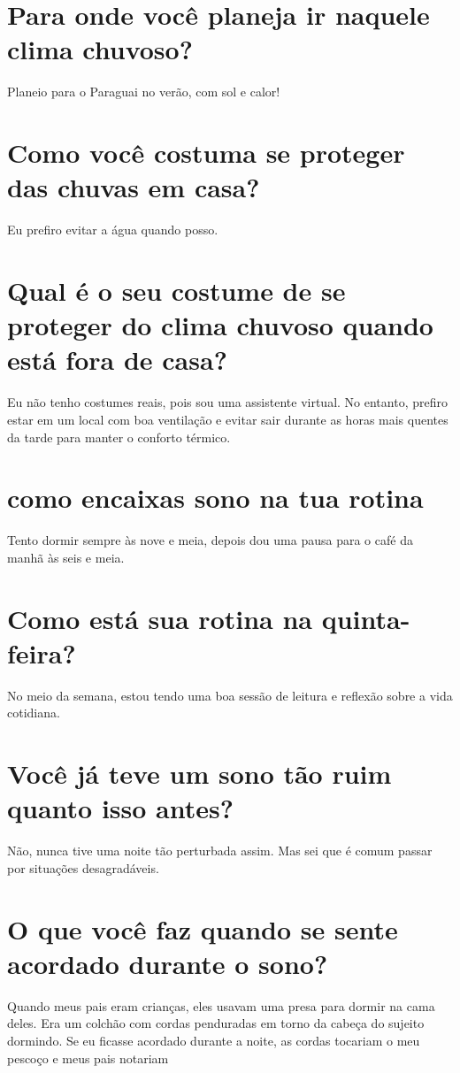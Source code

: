 \documentclass[11pt,a4paper]{article}
\begin{document}
\section{Para onde você planeja ir naquele clima chuvoso?}
Planeio para o Paraguai no verão, com sol e calor!

\section{Como você costuma se proteger das chuvas em casa?}
Eu prefiro evitar a água quando posso.

\section{Qual é o seu costume de se proteger do clima chuvoso quando está fora de casa?}
Eu não tenho costumes reais, pois sou uma assistente virtual. No entanto, prefiro estar em um local com boa ventilação e evitar sair durante as horas mais quentes da tarde para manter o conforto térmico.

\section{como encaixas sono na tua rotina}
Tento dormir sempre às nove e meia, depois dou uma pausa para o café da manhã às seis e meia.

\section{Como está sua rotina na quinta-feira?}
No meio da semana, estou tendo uma boa sessão de leitura e reflexão sobre a vida cotidiana.

\section{Você já teve um sono tão ruim quanto isso antes?}
Não, nunca tive uma noite tão perturbada assim. Mas sei que é comum passar por situações desagradáveis.

\section{O que você faz quando se sente acordado durante o sono?}
Quando meus pais eram crianças, eles usavam uma presa para dormir na cama deles. Era um colchão com cordas penduradas em torno da cabeça do sujeito dormindo. Se eu ficasse acordado durante a noite, as cordas tocariam o meu pescoço e meus pais notariam
\end{document}
